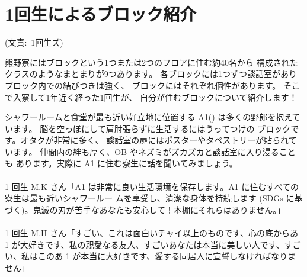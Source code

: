 \section{1回生によるブロック紹介}
(文責:\ 1回生ズ)

熊野寮にはブロックという1つまたは2つのフロアに住む約40名から
構成されたクラスのようなまとまりが9つあります。
各ブロックには1つずつ談話室がありブロック内での結びつきは強く、
ブロックにはそれぞれ個性があります。
そこで入寮して1年近く経った1回生が、
自分が住むブロックについて紹介します！

\vspace{7mm}


\noindent
{\Huge シ}ャワールームと食堂が最も近い好立地に位置する 
A1() は多くの野郎を抱えています。
脳を空っぽにして肩肘張らずに生活するにはうってつけの
ブロックです。オタクが非常に多く、
談話室の扉にはポスターやタペストリーが貼られています。
仲間内の絆も厚く、OB やネズミがズカズカと談話室に入り浸ることも
あります。実際に A1 に住む寮生に話を聞いてみましょう。\\
\\
1 回生 M.K さん「A1 は非常に良い生活環境を保存します。A1 に住むすべての寮生は最も近いシャワールー
ムを享受し、清潔な身体を持続します (SDGs に基づく)。鬼滅の刃が苦手なあなたも安心して！本棚にそれらはありません。」\\
\\
1 回生 M.H さん「すごい、これは面白いチャイ以上のものです、心の底からあ 1 が大好きです、私の親愛なる友人、すごいあなたは本当に美しい人です、すごい、私はこのあ 1 が本当に大好きです、愛する同居人に宣誓しなければなりません」

\vspace{7mm}


